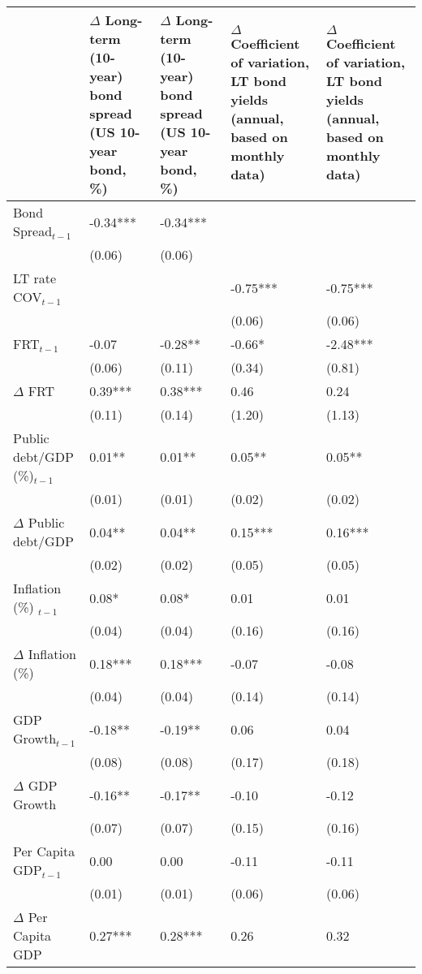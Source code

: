 \begingroup\tiny
\begin{tabular}{lp{3cm}p{3cm}p{3cm}p{3cm}}
  \hline
 & $\Delta$ Long-term (10-year) bond spread (US 10-year bond, \%) & $\Delta$ Long-term (10-year) bond spread (US 10-year bond, \%) & $\Delta$ Coefficient of variation, LT bond yields (annual, based on monthly data) & $\Delta$ Coefficient of variation, LT bond yields (annual, based on monthly data) \\ 
  \hline
Bond Spread$_{t-1}$ & -0.34*** & -0.34*** &  &  \\ 
   & (0.06) & (0.06) &  &  \\ 
  LT rate COV$_{t-1}$ &  &  & -0.75*** & -0.75*** \\ 
   &  &  & (0.06) & (0.06) \\ 
  FRT$_{t-1}$ & -0.07 & -0.28** & -0.66* & -2.48*** \\ 
   & (0.06) & (0.11) & (0.34) & (0.81) \\ 
  $\Delta$ FRT & 0.39*** & 0.38*** & 0.46 & 0.24 \\ 
   & (0.11) & (0.14) & (1.20) & (1.13) \\ 
  Public debt/GDP (\%)$_{t-1}$ & 0.01** & 0.01** & 0.05** & 0.05** \\ 
   & (0.01) & (0.01) & (0.02) & (0.02) \\ 
  $\Delta$ Public debt/GDP & 0.04** & 0.04** & 0.15*** & 0.16*** \\ 
   & (0.02) & (0.02) & (0.05) & (0.05) \\ 
  Inflation (\%) $_{t-1}$ & 0.08* & 0.08* & 0.01 & 0.01 \\ 
   & (0.04) & (0.04) & (0.16) & (0.16) \\ 
  $\Delta$ Inflation (\%) & 0.18*** & 0.18*** & -0.07 & -0.08 \\ 
   & (0.04) & (0.04) & (0.14) & (0.14) \\ 
  GDP Growth$_{t-1}$ & -0.18** & -0.19** & 0.06 & 0.04 \\ 
   & (0.08) & (0.08) & (0.17) & (0.18) \\ 
  $\Delta$ GDP Growth & -0.16** & -0.17** & -0.10 & -0.12 \\ 
   & (0.07) & (0.07) & (0.15) & (0.16) \\ 
  Per Capita GDP$_{t-1}$ & 0.00 & 0.00 & -0.11 & -0.11 \\ 
   & (0.01) & (0.01) & (0.06) & (0.06) \\ 
  $\Delta$ Per Capita GDP & 0.27*** & 0.28*** & 0.26 & 0.32 \\ 

\end{tabular}
